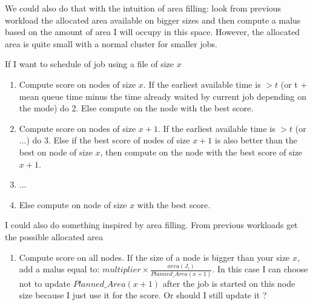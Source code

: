 \documentclass[a4paper]{article}
\begin{document}
We could also do that with the intuition of area filling: look from previous workload the allocated area available on bigger sizes and then compute a malus based on the amount of area I will occupy in this space. However, the allocated area is quite small with a normal cluster for smaller jobs.

If I want to schedule of job using a file of size $x$
\begin{enumerate}
	\item Compute score on nodes of size $x$. If the earliest available time is $> t$ (or t + mean queue time minus the time already waited by current job depending on the mode) do 2. Else compute on the node with the best score.
	\item Compute score on nodes of size $x + 1$. If the earliest available time is $> t$ (or ...) do 3. Else if the best score of nodes of size $x + 1$ is also better than the best on node of size $x$, then compute on the node with the best score of size $x+1$.
	\item ...
	\item Else compute on node of size $x$ with the best score.
\end{enumerate}

I could also do something inspired by area filling.
From previous workloads get the possible allocated area
\begin{enumerate}
	\item Compute score on all nodes. If the size of a node is bigger than your size $x$, add a malus equal to: $multiplier \times \frac{area(J_i)}{Planned\_Area(x+1)}$. In this case I can choose not to update $Planned\_Area(x+1)$ after the job is started on this node size because I just use it for the score. Or should I still update it ?
\end{enumerate}
\end{document}
